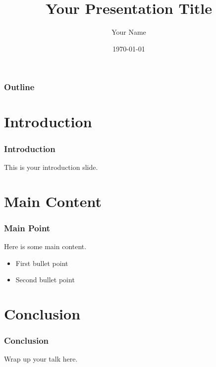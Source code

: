 \documentclass{beamer}
\title{Your Presentation Title}
\author{Your Name}
\date{\today}
\begin{document}
\begin{frame}
	\titlepage
\end{frame}

\begin{frame}
\frametitle{Outline}
\tableofcontents
\end{frame}

\section{Introduction}

\begin{frame}
\frametitle{Introduction}
This is your introduction slide.
\end{frame}

\section{Main Content}

\begin{frame}
\frametitle{Main Point}
Here is some main content.
\begin{itemize}
  \item First bullet point
  \item Second bullet point
\end{itemize}
\end{frame}

\section{Conclusion}

\begin{frame}
\frametitle{Conclusion}
Wrap up your talk here.
\end{frame}
\end{document}
